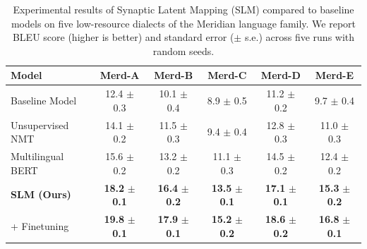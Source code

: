 \begin{table}[t]
  \centering
  \small
  \caption{Experimental results of Synaptic Latent Mapping (SLM) compared to baseline models on five low-resource dialects of the Meridian language family. We report BLEU score (higher is better) and standard error ($\pm$ s.e.) across five runs with random seeds.}
  \label{tab:results}
  \vspace{0.5em}
  \begin{tabular}{lccccc}
    \toprule
    \textbf{Model} & \textbf{Merd-A} & \textbf{Merd-B} & \textbf{Merd-C} & \textbf{Merd-D} & \textbf{Merd-E} \\
    \midrule
    Baseline Model & 12.4 $\pm$ 0.3 & 10.1 $\pm$ 0.4 & 8.9 $\pm$ 0.5 & 11.2 $\pm$ 0.2 & 9.7 $\pm$ 0.4 \\
    Unsupervised NMT & 14.1 $\pm$ 0.2 & 11.5 $\pm$ 0.3 & 9.4 $\pm$ 0.4 & 12.8 $\pm$ 0.3 & 11.0 $\pm$ 0.3 \\
    Multilingual BERT & 15.6 $\pm$ 0.2 & 13.2 $\pm$ 0.2 & 11.1 $\pm$ 0.3 & 14.5 $\pm$ 0.2 & 12.4 $\pm$ 0.2 \\
    \midrule
    \textbf{SLM (Ours)} & \textbf{18.2} $\pm$ \textbf{0.1} & \textbf{16.4} $\pm$ \textbf{0.2} & \textbf{13.5} $\pm$ \textbf{0.1} & \textbf{17.1} $\pm$ \textbf{0.1} & \textbf{15.3} $\pm$ \textbf{0.2} \\
    \quad + Finetuning & \textbf{19.8} $\pm$ \textbf{0.1} & \textbf{17.9} $\pm$ \textbf{0.1} & \textbf{15.2} $\pm$ \textbf{0.2} & \textbf{18.6} $\pm$ \textbf{0.2} & \textbf{16.8} $\pm$ \textbf{0.1} \\
    \bottomrule
  \end{tabular}
\end{table}
